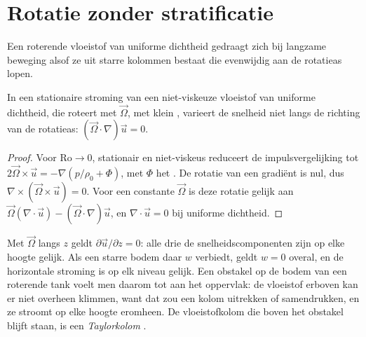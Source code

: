 \section{Rotatie zonder stratificatie}\label{sec:b3:gfd-foundations:taylor}

Een roterende vloeistof van uniforme dichtheid gedraagt zich bij langzame beweging
alsof ze uit starre kolommen bestaat die evenwijdig aan de rotatieas lopen.

\begin{theorem}\label{thm:b3:gfd-foundations:taylor-proudman}
In een stationaire stroming van een niet-viskeuze vloeistof van uniforme dichtheid, die roteert
met $\vec\Omega$, met klein , varieert de snelheid niet langs de richting van de
rotatieas: $(\vec\Omega\cdot\nabla)\vec u = 0$.
\end{theorem}

\begin{proof}
Voor $\mathrm{Ro}\to 0$, stationair en niet-viskeus reduceert de impulsvergelijking
tot $2\vec\Omega\times\vec u = -\nabla(p/\rho_0 + \Phi)$, met $\Phi$ het
. De rotatie van een gradiënt is nul, dus $\nabla\times(\vec\Omega
\times\vec u) = 0$. Voor een constante $\vec\Omega$ is deze rotatie gelijk aan $\vec\Omega
(\nabla\cdot\vec u) - (\vec\Omega\cdot\nabla)\vec u$, en $\nabla\cdot\vec u
= 0$ bij uniforme dichtheid.
\end{proof}

Met $\vec\Omega$ langs $z$ geldt $\partial\vec u/\partial z = 0$: alle drie de
snelheidscomponenten zijn op elke hoogte gelijk. Als een starre bodem daar $w$
verbiedt, geldt $w = 0$ overal, en de horizontale stroming is op elk niveau
gelijk. Een obstakel op de bodem van een roterende tank voelt men daarom tot
aan het oppervlak: de vloeistof erboven kan er niet overheen klimmen, want dat
zou een kolom uitrekken of samendrukken, en ze stroomt op elke hoogte eromheen.
De vloeistofkolom die boven het obstakel blijft staan, is een \emph{Taylorkolom}
.

